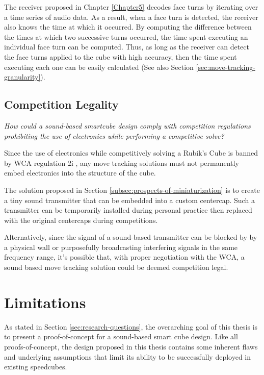 The receiver proposed in Chapter \ref{Chapter5} decodes face turns by
iterating over a time series of audio data. As a result, when a face
turn is detected, the receiver also knows the time at which it
occurred. By computing the difference between the times at which two
successive turns occurred, the time spent executing an individual face
turn can be computed. Thus, as long as the receiver can detect the face
turns applied to the cube with high accuracy, then the time spent
executing each one can be easily calculated (See also Section
\ref{sec:move-tracking-granularity}).


\subsection{Competition Legality}
\label{subsec:answer-competition-legality}

\emph{How could a sound-based smartcube design comply with competition
regulations prohibiting the use of electronics while performing a
competitive solve?}

Since the use of electronics while competitively solving a Rubik's Cube
is banned by WCA regulation 2i \cite{wca-regulations}, any move
tracking solutions must not permanently embed electronics into the
structure of the cube.

The solution proposed in Section
\ref{subsec:prospects-of-miniaturization} is to create a tiny sound
transmitter that can be embedded into a custom centercap. Such a
transmitter can be temporarily installed during personal practice then
replaced with the original centercaps during competitions.

Alternatively, since the signal of a sound-based transmitter can be
blocked by by a physical wall or purposefully broadcasting interfering
signals in the same frequency range, it's possible that, with proper
negotiation with the WCA, a sound based move tracking solution could be
deemed competition legal.


\section{Limitations}
\label{sec:limitations}

As stated in Section \ref{sec:research-questions}, the overarching goal
of this thesis is to present a proof-of-concept for a sound-based smart
cube design. Like all proofs-of-concept, the design proposed in this
thesis contains some inherent flaws and underlying assumptions that limit
its ability to be successfully deployed in existing speedcubes.

